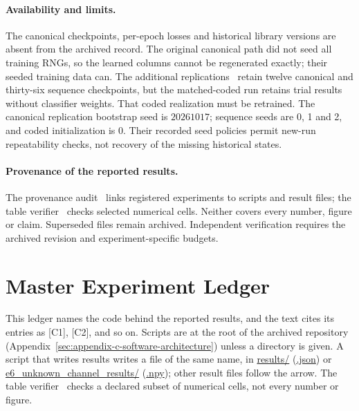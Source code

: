 \paragraph{Availability and limits.} The canonical checkpoints, per-epoch losses and historical library versions are absent from the archived record. The original canonical path did not seed all training RNGs, so the learned columns cannot be regenerated exactly; their seeded training data can. The additional replications~ retain twelve canonical and thirty-six sequence checkpoints, but the matched-coded run retains trial results without classifier weights. That coded realization must be retrained. The canonical replication bootstrap seed is $20261017$; sequence seeds are 0, 1 and 2, and coded initialization is 0. Their recorded seed policies permit new-run repeatability checks, not recovery of the missing historical states.

\paragraph{Provenance of the reported results.} The provenance audit~ links registered experiments to scripts and result files; the table verifier~ checks selected numerical cells. Neither covers every number, figure or claim. Superseded files remain archived. Independent verification requires the archived revision and experiment-specific budgets.



\clearpage

\section{Master Experiment Ledger}\label{sec:appendix-e-master-experiment-ledger}

This ledger names the code behind the reported results, and the text cites its entries as [C1], [C2], and so on. Scripts are at the root of the archived repository (Appendix~\ref{sec:appendix-c-software-architecture}) unless a directory is given. A script that writes results writes a file of the same name, in \url{results/} (\url{.json}) or \url{e6_unknown_channel_results/} (\url{.npy}); other result files follow the arrow. The table verifier~ checks a declared subset of numerical cells, not every number or figure.


